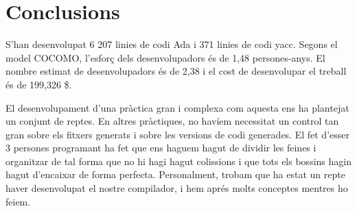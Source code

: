\section{Conclusions}
S'han desenvolupat 6 207 linies de codi Ada i 371 linies de codi yacc. Segons
el model COCOMO, l'esforç dels desenvolupadors és de 1,48 persones-anys. El
nombre estimat de desenvolupadors és de 2,38 i el cost de desenvolupar el
treball és de 199,326 \$.

El desenvolupament d'una pràctica gran i complexa com aquesta ens ha plantejat
un conjunt de reptes. En altres pràctiques, no havíem necessitat un control tan
gran sobre els fitxers generats i sobre les versions de codi generades. El fet
d'esser 3 persones programant ha fet que ens haguem hagut de dividir les feines i
organitzar de tal forma que no hi hagi hagut colissions i que tots els bossins
hagin hagut d'encaixar de forma perfecta. Personalment, trobam que ha estat un
repte haver desenvolupat el nostre compilador, i hem aprés molts conceptes
mentres ho feiem.

